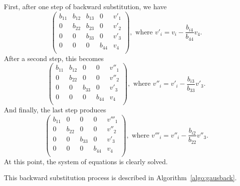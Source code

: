 \documentclass{article}
\begin{document}
        First, after one step of backward substitution, we have
        \begin{equation*}
            \begin{pmatrix}
                b_{11} & b_{12}  & b_{13}   & 0      & v'_1 \\
                0      & b_{22}  & b_{23}   & 0      & v'_2 \\
                0      & 0       & b_{33}   & 0      & v'_3 \\
                0      & 0       & 0        & b_{44} & v_4  \\
            \end{pmatrix}, \text{ where }
            v'_i = v_i - \frac{b_{i4}}{b_{44}} v_4 .
        \end{equation*}
        After a second step, this becomes
        \begin{equation*}
            \begin{pmatrix}
                b_{11} & b_{12}  & 0        & 0      & v''_1 \\
                0      & b_{22}  & 0        & 0      & v''_2 \\
                0      & 0       & b_{33}   & 0      & v'_3  \\
                0      & 0       & 0        & b_{44} & v_4   \\
            \end{pmatrix}, \text{ where }
            v''_i = v'_i - \frac{b_{i3}}{b_{33}} v'_3 .
        \end{equation*}
        And finally, the last step produces
        \begin{equation*}
            \begin{pmatrix}
                b_{11} & 0       & 0        & 0      & v'''_1 \\
                0      & b_{22}  & 0        & 0      & v''_2 \\
                0      & 0       & b_{33}   & 0      & v'_3  \\
                0      & 0       & 0        & b_{44} & v_4   \\
            \end{pmatrix}, \text{ where }
            v'''_i = v''_i - \frac{b_{i2}}{b_{22}} v''_3 .
        \end{equation*}
        At this point, the system of equations is clearly solved.

        This backward substitution process is described in Algorithm~\ref{algo:gausback}.
\end{document}
